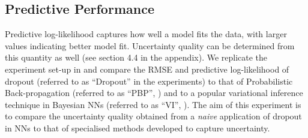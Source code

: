 \documentclass{article}
\def\red#1{\textcolor{red}{#1}}
\theoremstyle{definition}
\begin{document}


\subsection{Predictive Performance}

Predictive log-likelihood captures how well a model fits the data, with larger values indicating better model fit. Uncertainty quality can be determined from this quantity as well (see section 4.4 in the appendix). We replicate the experiment set-up in \citet{hernandez2015probabilistic} and compare the RMSE and predictive log-likelihood of dropout (referred to as ``Dropout'' in the experiments) to that of Probabilistic Back-propagation (referred to as ``PBP'', \citep{hernandez2015probabilistic}) and to a popular variational inference technique in Bayesian NNs (referred to as ``VI'', \citep{graves2011practical}). The aim of this experiment is to compare the uncertainty quality obtained from a \textit{naive} application of dropout in NNs to that of specialised methods developed to capture uncertainty. 
\end{document}
